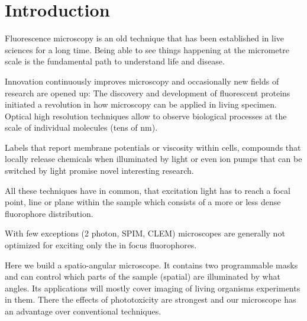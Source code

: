 \chapter{Introduction}
Fluorescence microscopy is an old technique that has been established
in live sciences for a long time. Being able to see things happening
at the micrometre scale is the fundamental path to understand life and
disease.

Innovation continuously improves microscopy and occasionally new
fields of research are opened up: The discovery and development of
fluorescent proteins initiated a revolution in how microscopy can be
applied in living specimen. Optical high resolution techniques allow
to observe biological processes at the scale of individual molecules
(tens of nm). 

Labels that report membrane potentials or viscosity within cells,
compounds that locally release chemicals when illuminated by light or
even ion pumps that can be switched by light promise novel interesting
research.

All these techniques have in common, that excitation light has to
reach a focal point, line or plane within the sample which consists of
a more or less dense fluorophore distribution.

With few exceptions (2 photon, SPIM, CLEM) microscopes are generally
not optimized for exciting only the in focus fluorophores.

Here we build a spatio-angular microscope. It contains two
programmable masks and can control which parts of the sample (spatial)
are illuminated by what angles. Its applications will mostly cover
imaging of living organisms experiments in them. There the effects of
phototoxicity are strongest and our microscope has an advantage over
conventional techniques.
